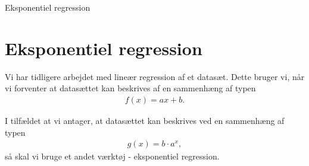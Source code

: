 \begin{center}
\Huge
Eksponentiel regression
\end{center}

\section*{Eksponentiel regression}

Vi har tidligere arbejdet med lineær regression af et datasæt. Dette bruger vi, når vi forventer at datasættet kan beskrives af en sammenhæng af typen
\begin{align*}
	f(x) = ax+b.
\end{align*}

I tilfældet at vi antager, at datasættet kan beskrives ved en sammenhæng af typen 
\begin{align*}
	g(x) = b\cdot a^x, 
\end{align*}
så skal vi bruge et andet værktøj - eksponentiel regression. 


